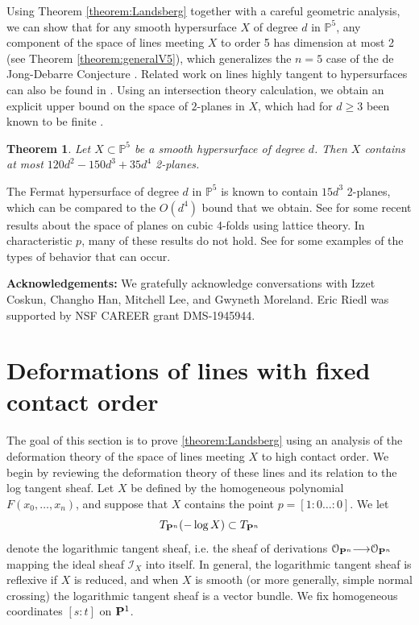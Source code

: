 \documentclass[12pt,reqno]{amsart}
\theoremstyle{plain}
\newtheorem{theorem}{Theorem}[section]
\theoremstyle{remark}
\numberwithin{equation}{section}
\renewcommand{\to}{{\longrightarrow}}
\renewcommand {\P}{{\bf P}}
\numberwithin{equation}{section}
\renewcommand{\O}{\mathcal O}
\newcommand{\I}{\mathcal{I}}
\newcommand{\PP}{\mathbb P}
\begin{document}
Using Theorem \ref{theorem:Landsberg} together with a careful geometric analysis, we can show that for any smooth hypersurface $X$ of degree $d$ in $\PP^5$, any component of the space of lines meeting $X$ to order 5 has dimension at most 2 (see Theorem \ref{theorem:generalV5}), which generalizes the $n=5$ case of the de Jong-Debarre Conjecture \cite{Beheshti}. Related work on lines highly tangent to hypersurfaces can also be found in \cite{lloydSmith}. Using an intersection theory calculation, we obtain an explicit upper bound on the space of $2$-planes in $X$, which had for $d \geq 3$ been known to be finite \cite[Corollary in Appendix]{Browning2016}.

\begin{theorem}
Let $X \subset \PP^5$ be a smooth hypersurface of degree $d$. Then $X$ contains at most $120 d^2 - 150 d^3 + 35 d^4$ 2-planes.
\end{theorem}

The Fermat hypersurface of degree $d$ in $\PP^5$ is known to contain $15d^3$ 2-planes, which can be compared to the $O(d^4)$ bound that we obtain. See \cite{DegItenOtt} for some recent results about the space of planes on cubic 4-folds using lattice theory. In characteristic $p$, many of these results do not hold. See \cite{Cheng} for some examples of the types of behavior that can occur.

\textbf{Acknowledgements:} We gratefully acknowledge conversations with Izzet Coskun, Changho Han, Mitchell Lee, and Gwyneth Moreland. Eric Riedl was supported by NSF CAREER grant DMS-1945944.

\section{Deformations of lines with fixed contact order}
\label{sec:proof-Landsberg}

The goal of this section is to prove \autoref{theorem:Landsberg} using an analysis of the deformation theory of the space of lines meeting $X$ to high contact order. We begin by reviewing the deformation theory of these lines and its relation to the log tangent sheaf. Let $X$ be defined by the homogeneous polynomial
$F(x_0, \ldots, x_n)$, and suppose that $X$ contains the point
$p=\left[1:0 \ldots: 0 \right]$.  We let
\[T_{\P^{n}}(- \log X) \subset T_{\P^{n}}\] denote the logarithmic
tangent sheaf, i.e. the sheaf of derivations
$\O_{\P^{n}} \to \O_{\P^{n}}$ mapping the ideal sheaf $\I_{X}$ into
itself.  In general, the logarithmic tangent sheaf is reflexive if $X$
is reduced, and when $X$ is smooth (or more generally, simple normal crossing) the logarithmic tangent sheaf is a
vector bundle.  We fix homogeneous coordinates $[s:t]$ on
$\P^{1}$.
\end{document}
